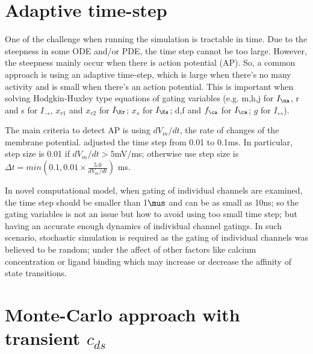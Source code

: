 \section{Adaptive time-step}

One of the challenge when running the simulation is tractable in time. Due to
the steepness in some ODE and/or PDE, the time step cannot be too large.
However, the steepness mainly occur when there is action potential (AP). So, a
common approach is using an adaptive time-step, which is large when there's no
many activity and is small when there's an action potential. This is important 
when solving Hodgkin-Huxley type equations of gating variables (e.g. m,h,j for
$I_\na$, r and s for $I_\to$, $x_{r1}$ and $x_{r2}$ for $I_\Kr$; $x_s$ for
$I_\Ks$; d,f and $f_\ca$ for $I_\ca$; $g$ for $I_\rel$).

The main criteria to detect AP is using $dV_m/dt$, the rate of changes of the
membrane potential. \citep{rush1978pas} adjusted the time step from 0.01 to
0.1ms. In particular, step size is 0.01 if $dV_m/dt > 5$mV/ms; otherwise use
step size is $\Delta t=min(0.1, 0.01 \times \frac{5.0}{dV_m/dt})$ ms.

In novel computational model, when gating of individual channels are examined,
the time step should be smaller than 1$\mus$ and can be as small as 10ns; so the
gating variables is not an issue but how to avoid using too small time step; but
having an accurate enough dynamics of individual channel gatings. In such
scenario, stochastic simulation is required as the gating of individual channels
was believed to be random; under the affect of other factors like calcium
concentration or ligand binding which may increase or decrease the affinity of
state transitions. 

\section{Monte-Carlo approach with transient $c_{ds}$}
\label{sec:monte-carlo-approach-1}

